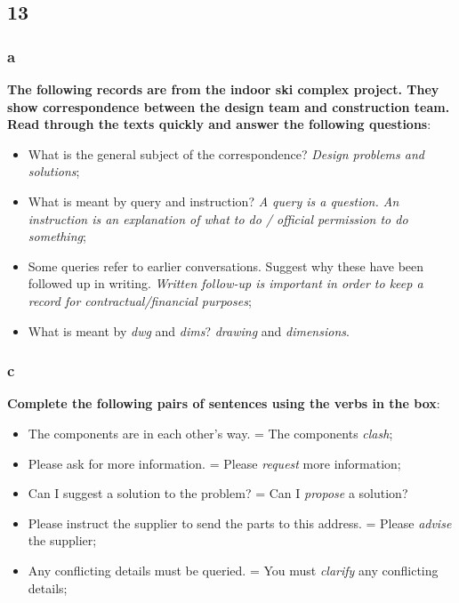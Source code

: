 \subsection{13}

\subsubsection{a}

\textbf{The following records are from the indoor ski complex project. They show correspondence between the design team and construction team. Read through the texts quickly and answer the following questions}:

\begin{itemize}

\item What is the general subject of the correspondence? \textit{Design problems and solutions};
\item What is meant by query and instruction? \textit{A query is a question. An instruction is an explanation of what to do / official permission to do something};
\item Some queries refer to earlier conversations. Suggest why these have been followed up in writing. \textit{Written follow-up is important in order to keep a record for contractual/financial purposes};
\item What is meant by \textit{dwg} and \textit{dims}? \textit{drawing} and \textit{dimensions}.

\end{itemize}

\subsubsection{c}

\textbf{Complete the following pairs of sentences using the verbs in the box}:

\begin{itemize}

\item The components are in each other's way. = The components \textit{clash};
\item Please ask for more information. = Please \textit{request} more information;
\item Can I suggest a solution to the problem? = Can I \textit{propose} a solution?
\item Please instruct the supplier to send the parts to this address. = Please \textit{advise} the supplier;
\item  Any conflicting details must be queried. = You must \textit{clarify} any conflicting details;

\end{itemize}

